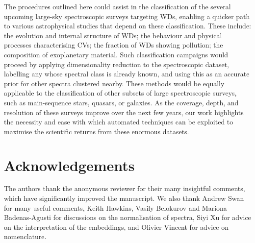 \documentclass[fleqn,usenatbib]{mnras}
\begin{document}
The procedures outlined here could assist in the classification of the several upcoming large-sky spectroscopic surveys targeting WDs, enabling a quicker path to various astrophysical studies that depend on these classification.
These include: the evolution and internal structure of WDs; the behaviour and physical processes characterising CVs; the fraction of WDs showing pollution; the composition of exoplanetary material.
Such classification campaigns would proceed by applying dimensionality reduction to the spectroscopic dataset, labelling any whose spectral class is already known, and using this as an accurate prior for other spectra clustered nearby.
These methods would be equally applicable to the classification of other subsets of large spectroscopic surveys, such as main-sequence stars, quasars, or galaxies.
As the coverage, depth, and resolution of these surveys improve over the next few years, our work highlights the necessity and ease with which automated techniques can be exploited to maximise the scientific returns from these enormous datasets.

\section*{Acknowledgements}

The authors thank the anonymous reviewer for their many insightful comments, which have significantly improved the manuscript.
We also thank Andrew Swan for many useful comments, Keith Hawkins, Vasily Belokurov and Mariona Badenas-Agusti for discussions on the normalisation of spectra, Siyi Xu for advice on the interpretation of the embeddings, and Olivier Vincent for advice on nomenclature.
\end{document}
